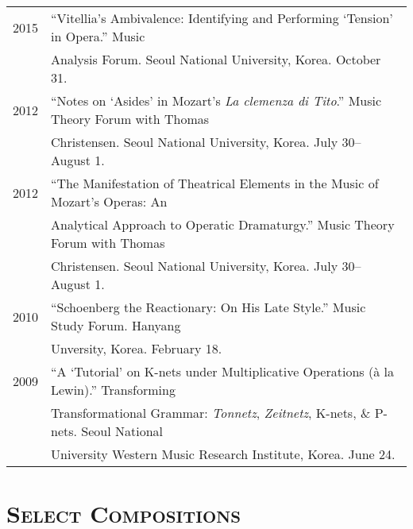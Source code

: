 \documentclass[a4paper,11pt]{article}
\begin{document}
  \hspace*{-0.25cm}
  \begin{tabular}{p{2.5cm} p{12.5cm}}
  2015 & “Vitellia’s Ambivalence: Identifying and Performing ‘Tension’ in Opera.” Music\\
  & Analysis Forum. Seoul National University, Korea. October 31.\\[2mm]
  
  
  2012 & “Notes on ‘Asides’ in Mozart’s \textit{La clemenza di Tito}.” Music Theory Forum with Thomas\\
  & Christensen. Seoul National University, Korea. July 30–August 1.\\[2mm]

  2012 & “The Manifestation of Theatrical Elements in the Music of Mozart’s Operas: An\\
  & Analytical Approach to Operatic Dramaturgy.” Music Theory Forum with Thomas\\
  & Christensen. Seoul National University, Korea. July 30–August 1.\\[2mm]

  2010 & “Schoenberg the Reactionary: On His Late Style.” Music Study Forum. Hanyang\\
  & Unversity, Korea. February 18.\\[2mm]
  
  2009 & “A ‘Tutorial’ on K-nets under Multiplicative Operations (à la Lewin).” Transforming\\
  & Transformational Grammar: \textit{Tonnetz}, \textit{Zeitnetz}, K-nets, \& P-nets. Seoul National\\
  & University Western Music Research Institute, Korea. June 24.
  \end{tabular}
  
  \vspace{2.5mm}
  
  \section*{\textsc{Select Compositions}}
  
\end{document}
